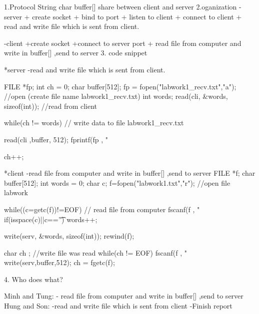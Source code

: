 1.Protocol
  String char buffer[] share between client and server
2.oganization
 -server
   + create socket
   + bind to port
   + listen to client
   + connect to client
   + read and write file which is sent from client.

 -client
   +create socket
   +connect to server port
   + read file from computer and write in buffer[] ,send to server
3. code snippet

    *server
	-read and write file which is sent from client.  

	FILE *fp;
         	int ch = 0;
		char buffer[512];
           	fp = fopen("labwork1_recv.txt","a");            		//open (create file name labwork1_recv.txt) 
            	int words;
		read(cli, &words, sizeof(int));					//read from client
            	
          	while(ch != words)						// write data to file labwork1_recv.txt
       	   	{
        	 	read(cli ,buffer, 512); 
	   	 	fprintf(fp , " %
		 	
		 	ch++;
	   	}



	*client
	-read file from computer and write in buffer[] ,send to server
	FILE *f;
    	char buffer[512];
    	int words = 0;
    	char c;
     	f=fopen("labwork1.txt","r");               //open file labwork
	
    	while((c=getc(f))!=EOF)			   // read file from computer
	{	
		fscanf(f , "%
		if(isspace(c)||c=='\t')
		words++;	
	}
	
       
      
	write(serv, &words, sizeof(int));           
     	rewind(f);
      
        char ch ;                                       //write file was read
      	while(ch != EOF)
      	{
		fscanf(f , "%
		write(serv,buffer,512);
		ch = fgetc(f);
      	}

 4. Who does what?

    Minh and Tung:
	- read file from computer and write in buffer[] ,send to server
    Hung and Son:
	-read and write file which is sent from client
	-Finish report